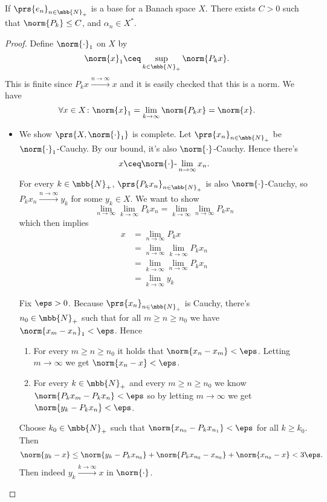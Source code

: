 \documentclass[10pt, twoside]{book}
\begin{document}
\begin{theorem}
If $\prs{e_n}_{n \in \mbb{N}_+}$ is a base for a Banach space $X$. There exists $C>0$ such that $\norm{P_k} \leq C$, and $\alpha_n \in X^*$.
\end{theorem}

\begin{proof}
Define $\norm{\cdot}_1$ on $X$ by
\[\norm{x}_1 \ceq \sup_{k \in \mbb{N}_+} \norm{P_k x} \text{.}\]
This is finite since $P_k x \xrightarrow{n\to\infty} x$ and it is easily checked that this is a norm.
We have
\[\forall x \in X \colon \norm{x}_1 = \lim_{k \to \infty} \norm{P_k x} = \norm{x} \text{.}\]

\begin{itemize}
\item We show $\prs{X, \norm{\cdot}_1}$ is complete. Let $\prs{x_n}_{n \in \mbb{N}_+}$ be $\norm{\cdot}_1$-Cauchy. By our bound, it's also $\norm{\cdot}$-Cauchy. Hence there's
\[x \ceq \norm{\cdot}\text{-}\lim_{n\to\infty} x_n \text{.}\]
For every $k \in \mbb{N}_+$, $\prs{P_k x_n}_{n \in \mbb{N}_+}$ is also $\norm{\cdot}$-Cauchy, so $P_k x_n \xrightarrow{n\to\infty} y_k$ for some $y_k \in X$. We want to show
\[\lim_{n\to\infty} \lim_{k\to\infty} P_k x_n
=
\lim_{k \to \infty} \lim_{n\to\infty} P_k x_n\]
which then implies
\begin{align*}
x
&=
\lim_{n\to\infty} P_k x
\\&=
\lim_{n\to\infty} \lim_{k\to\infty} P_k x_n
\\&=
\lim_{k \to \infty} \lim_{n\to\infty} P_k x_n
\\&=
\lim_{k\to\infty} y_k
\end{align*}

Fix $\eps > 0$. Because $\prs{x_n}_{n \in \mbb{N}_+}$ is Cauchy, there's $n_0 \in \mbb{N}_+$ such that for all $m \geq n \geq n_0$ we have $\norm{x_m - x_n}_1 < \eps$.
Hence
\begin{enumerate}
\item For every $m \geq n \geq n_0$ it holds that $\norm{x_n - x_m} < \eps$. Letting $m \to \infty$ we get $\norm{x_n - x} < \eps$.
\item For every $k \in \mbb{N}_+$ and every $m \geq n \geq n_0$ we know $\norm{P_k x_m - P_k x_n} < \eps$ so by letting $m \to \infty$ we get $\norm{y_k - P_k x_n} < \eps$.
\end{enumerate}

Choose $k_0 \in \mbb{N}_+$ such that $\norm{x_{n_0} - P_k x_{n_1}} < \eps$ for all $k \geq k_0$. Then
\[\norm{y_k - x} \leq \norm{y_k - P_k x_{n_0}} + \norm{P_k x_{n_0} - x_{n_0}} + \norm{x_{n_0} - x} < 3\eps \text{.}\]
Then indeed $y_k \xrightarrow{k \to \infty} x$ in $\norm{\cdot}$.


\end{itemize}
\end{proof}
\end{document}
